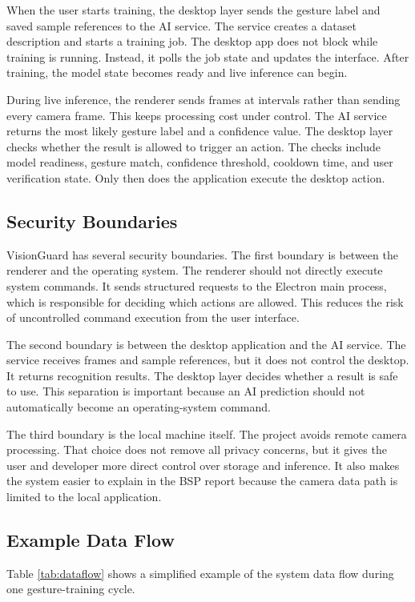 \documentclass[10pt,twocolumn]{article}
\begin{document}
When the user starts training, the desktop layer sends the gesture label and saved sample references to the AI service.
The service creates a dataset description and starts a training job.
The desktop app does not block while training is running.
Instead, it polls the job state and updates the interface.
After training, the model state becomes ready and live inference can begin.

During live inference, the renderer sends frames at intervals rather than sending every camera frame.
This keeps processing cost under control.
The AI service returns the most likely gesture label and a confidence value.
The desktop layer checks whether the result is allowed to trigger an action.
The checks include model readiness, gesture match, confidence threshold, cooldown time, and user verification state.
Only then does the application execute the desktop action.

\subsection{Security Boundaries}
VisionGuard has several security boundaries.
The first boundary is between the renderer and the operating system.
The renderer should not directly execute system commands.
It sends structured requests to the Electron main process, which is responsible for deciding which actions are allowed.
This reduces the risk of uncontrolled command execution from the user interface.

The second boundary is between the desktop application and the AI service.
The service receives frames and sample references, but it does not control the desktop.
It returns recognition results.
The desktop layer decides whether a result is safe to use.
This separation is important because an AI prediction should not automatically become an operating-system command.

The third boundary is the local machine itself.
The project avoids remote camera processing.
That choice does not remove all privacy concerns, but it gives the user and developer more direct control over storage and inference.
It also makes the system easier to explain in the BSP report because the camera data path is limited to the local application.

\subsection{Example Data Flow}
Table \ref{tab:dataflow} shows a simplified example of the system data flow during one gesture-training cycle.
\end{document}
